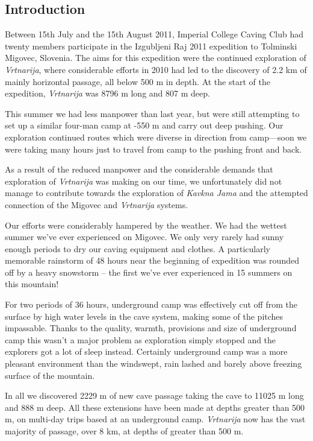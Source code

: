 \hypertarget{introduction-2}{%
\subsection{Introduction}\label{introduction-2}}

Between 15th July and the 15th August 2011, Imperial College Caving Club
had twenty members participate in the Izgubljeni Raj 2011 expedition to
Tolminski Migovec, Slovenia. The aims for this expedition were the
continued exploration of \emph{Vrtnarija}, where considerable efforts in
2010 had led to the discovery of 2.2 km of mainly horizontal passage,
all below 500 m in depth. At the start of the expedition,
\emph{Vrtnarija} was 8796 m long and 807 m deep.

This summer we had less manpower than last year, but were still
attempting to set up a similar four-man camp at -550 m and carry out
deep pushing. Our exploration continued routes which were diverse in
direction from camp---soon we were taking many hours just to travel from
camp to the pushing front and back.

As a result of the reduced manpower and the considerable demands that
exploration of \emph{Vrtnarija} was making on our time, we unfortunately
did not manage to contribute towards the exploration of \emph{Kavkna
Jama} and the attempted connection of the Migovec and \emph{Vrtnarija}
systems.

Our efforts were considerably hampered by the weather. We had the
wettest summer we've ever experienced on Migovec. We only very rarely
had sunny enough periods to dry our caving equipment and clothes. A
particularly memorable rainstorm of 48 hours near the beginning of
expedition was rounded off by a heavy snowstorm -- the first we've ever
experienced in 15 summers on this mountain!

For two periods of 36 hours, underground camp was effectively cut off
from the surface by high water levels in the cave system, making some of
the pitches impassable. Thanks to the quality, warmth, provisions and
size of underground camp this wasn't a major problem as exploration
simply stopped and the explorers got a lot of sleep instead. Certainly
underground camp was a more pleasant environment than the windswept,
rain lashed and barely above freezing surface of the mountain.

In all we discovered 2229 m of new cave passage taking the cave to 11025
m long and 888 m deep. All these extensions have been made at depths
greater than 500 m, on multi-day trips based at an underground camp.
\emph{Vrtnarija} now has the vast majority of passage, over 8 km, at
depths of greater than 500 m.

